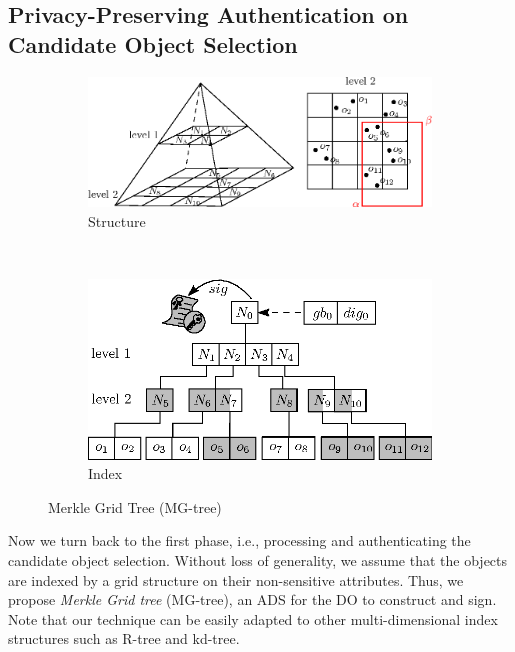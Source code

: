 \subsection{Privacy-Preserving Authentication on Candidate Object Selection}\label{sec:aggregate-queries:grid}

\begin{figure}[t]
  \centering
  \begin{subfigure}[b]{.5\linewidth}
    \centering
    \includegraphics[width=\linewidth]{figs/aggregate-queries/pyramid.eps}
    \caption{Structure}\label{fig:aggregate-queries:mg-tree:structure}
  \end{subfigure}~%
  \begin{subfigure}[b]{0.5\linewidth}
    \centering
    \includegraphics[width=.8\linewidth]{figs/aggregate-queries/grid_tree.eps}
    \caption{Index}\label{fig:aggregate-queries:mg-tree:index}
  \end{subfigure}
  \caption{Merkle Grid Tree (MG-tree)}\label{fig:aggregate-queries:mg-tree}
\end{figure}

Now we turn back to the first phase, i.e., processing and authenticating the candidate object selection. Without loss of generality, we assume that the objects are indexed by a grid structure on their non-sensitive attributes. Thus, we propose \emph{Merkle Grid tree} (MG-tree), an ADS for the DO to construct and sign. Note that our technique can be easily adapted to other multi-dimensional index structures such as R-tree and kd-tree.

